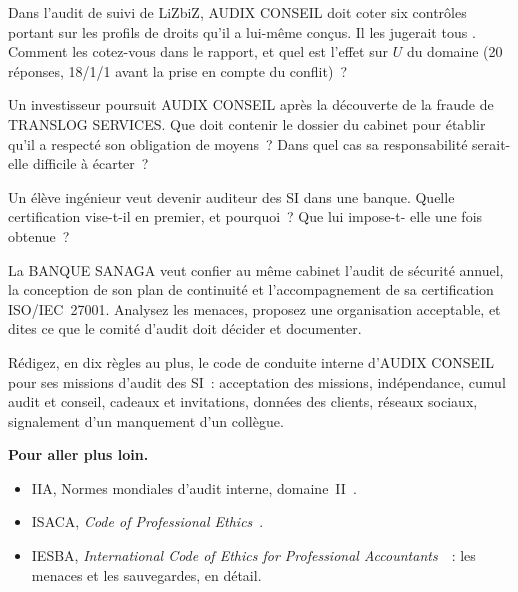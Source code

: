 \begin{boxexo}[title={\ding{45}\quad Exercice~16.6. La cotation en conflit \niveaumoyen}]
Dans l'audit de suivi de LiZbiZ, AUDIX CONSEIL doit coter six contrôles
portant sur les profils de droits qu'il a lui-même conçus. Il les jugerait
tous \OUI{}. Comment les cotez-vous dans le rapport, et quel est l'effet
sur $U$ du domaine (20 réponses, 18/1/1 avant la prise en compte du
conflit)~?
\end{boxexo}

\begin{boxexo}[title={\ding{45}\quad Exercice~16.7. Responsabilité \niveaumoyen}]
Un investisseur poursuit AUDIX CONSEIL après la découverte de la fraude
de TRANSLOG SERVICES. Que doit contenir le dossier du cabinet pour établir
qu'il a respecté son obligation de moyens~? Dans quel cas sa
responsabilité serait-elle difficile à écarter~?
\end{boxexo}

\begin{boxexo}[title={\ding{45}\quad Exercice~16.8. Une certification \niveaubase}]
Un élève ingénieur veut devenir auditeur des SI dans une banque.
Quelle certification vise-t-il en premier, et pourquoi~? Que lui impose-t-
elle une fois obtenue~?
\end{boxexo}

\begin{boxexo}[title={\ding{45}\quad Exercice~16.9. Audit et conseil \niveauexpert}]
La BANQUE SANAGA veut confier au même cabinet l'audit de sécurité annuel,
la conception de son plan de continuité et l'accompagnement de sa
certification ISO/IEC~27001. Analysez les menaces, proposez une
organisation acceptable, et dites ce que le comité d'audit doit décider et
documenter.
\end{boxexo}

\begin{boxexo}[title={\ding{45}\quad Exercice~16.10. Un code pour AUDIX CONSEIL \niveauexpert}]
Rédigez, en dix règles au plus, le code de conduite interne d'AUDIX
CONSEIL pour ses missions d'audit des SI~: acceptation des missions,
indépendance, cumul audit et conseil, cadeaux et invitations, données des
clients, réseaux sociaux, signalement d'un manquement d'un collègue.
\end{boxexo}

\bigskip

\begin{boxinfo}
\textbf{Pour aller plus loin.}
\begin{itemize}
    \item IIA, Normes mondiales d'audit interne, domaine~II~\cite{iia2024gias}.
    \item ISACA, \textit{Code of Professional Ethics}~\cite{isaca2024ethique}.
    \item IESBA, \textit{International Code of Ethics for Professional
          Accountants}~\cite{iesba2018code}~: les menaces et les
          sauvegardes, en détail.
\end{itemize}
\end{boxinfo}

